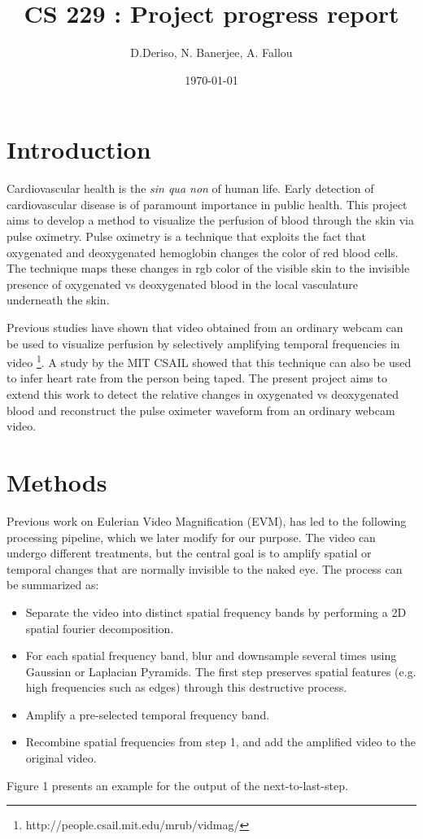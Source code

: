 \documentclass[12pt]{article}
\begin{document}
  \title{CS 229 : Project progress report}
  \author{D.Deriso, N. Banerjee, A. Fallou}
  \date{\today}
  \maketitle
  \thispagestyle{empty}



\section*{Introduction}
%
\small  
Cardiovascular health is the \emph{sin qua non} of human life. Early detection of cardiovascular disease is of paramount importance in public health. This project aims to develop a method to visualize the perfusion of blood through the skin via pulse oximetry. Pulse oximetry is a technique that exploits the fact that oxygenated and deoxygenated hemoglobin changes the color of red blood cells. The technique maps these changes in rgb color of the visible skin to the invisible presence of oxygenated vs deoxygenated blood in the local vasculature underneath the skin.

Previous studies have shown that video obtained from an ordinary webcam can be used to visualize perfusion by selectively amplifying temporal frequencies in video \footnote{http://people.csail.mit.edu/mrub/vidmag/}. A study by the MIT CSAIL showed that this technique can also be used to infer heart rate from the person being taped. The present project aims to extend this work to detect the relative changes in oxygenated vs deoxygenated blood and reconstruct the pulse oximeter waveform from an ordinary webcam video.



\section{Methods}

Previous work on Eulerian Video Magnification (EVM), has led to the following processing pipeline, which we later modify for our purpose. The video can undergo different treatments, but the central goal is to amplify spatial or temporal changes that are normally invisible to the naked eye. The process can be summarized as:

\begin{itemize}
\item Separate the video into distinct spatial frequency bands by performing a 2D spatial fourier decomposition. 
\item For each spatial frequency band, blur and downsample several times using Gaussian or Laplacian Pyramids. The first step preserves spatial features (e.g. high frequencies such as edges) through this destructive process.
\item Amplify a pre-selected temporal frequency band.
\item Recombine spatial frequencies from step 1, and add the amplified video to the original video.
\end{itemize}
Figure 1 presents an example for the output of the next-to-last-step. 
\end{document}
